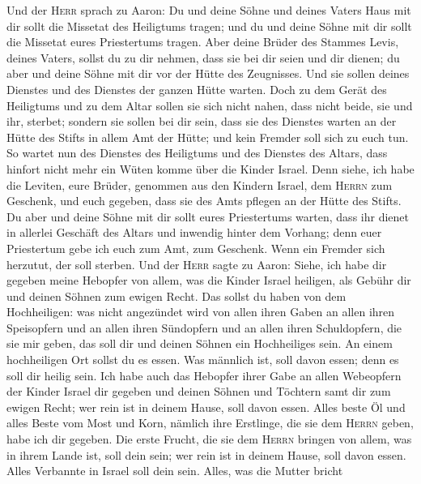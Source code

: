  Und der \textsc{Herr} sprach zu Aaron: Du und deine Söhne
und deines Vaters Haus mit dir sollt die Missetat des Heiligtums tragen;
und du und deine Söhne mit dir sollt die Missetat eures Priestertums
tragen.  Aber deine Brüder des Stammes Levis, deines
Vaters, sollst du zu dir nehmen, dass sie bei dir seien und dir dienen;
du aber und deine Söhne mit dir vor der Hütte des Zeugnisses.
 Und sie sollen deines Dienstes und des Dienstes der
ganzen Hütte warten. Doch zu dem Gerät des Heiligtums und zu dem Altar
sollen sie sich nicht nahen, dass nicht beide, sie und ihr, sterbet;
 sondern sie sollen bei dir sein, dass sie des Dienstes
warten an der Hütte des Stifts in allem Amt der Hütte; und kein Fremder
soll sich zu euch tun.  So wartet nun des Dienstes des
Heiligtums und des Dienstes des Altars, dass hinfort nicht mehr ein
Wüten komme über die Kinder Israel.  Denn siehe, ich habe
die Leviten, eure Brüder, genommen aus den Kindern Israel, dem
\textsc{Herrn} zum Geschenk, und euch gegeben, dass sie des Amts pflegen
an der Hütte des Stifts.  Du aber und deine Söhne mit dir
sollt eures Priestertums warten, dass ihr dienet in allerlei Geschäft
des Altars und inwendig hinter dem Vorhang; denn euer Priestertum gebe
ich euch zum Amt, zum Geschenk. Wenn ein Fremder sich herzutut, der soll
sterben.  Und der \textsc{Herr} sagte zu Aaron: Siehe, ich
habe dir gegeben meine Hebopfer von allem, was die Kinder Israel
heiligen, als Gebühr dir und deinen Söhnen zum ewigen Recht.
 Das sollst du haben von dem Hochheiligen: was nicht
angezündet wird von allen ihren Gaben an allen ihren Speisopfern und an
allen ihren Sündopfern und an allen ihren Schuldopfern, die sie mir
geben, das soll dir und deinen Söhnen ein Hochheiliges sein.
 An einem hochheiligen Ort sollst du es essen. Was
männlich ist, soll davon essen; denn es soll dir heilig sein.
 Ich habe auch das Hebopfer ihrer Gabe an allen
Webeopfern der Kinder Israel dir gegeben und deinen Söhnen und Töchtern
samt dir zum ewigen Recht; wer rein ist in deinem Hause, soll davon
essen.  Alles beste Öl und alles Beste vom Most und Korn,
nämlich ihre Erstlinge, die sie dem \textsc{Herrn} geben, habe ich dir
gegeben.  Die erste Frucht, die sie dem \textsc{Herrn}
bringen von allem, was in ihrem Lande ist, soll dein sein; wer rein ist
in deinem Hause, soll davon essen.  Alles Verbannte in
Israel soll dein sein.  Alles, was die Mutter bricht

